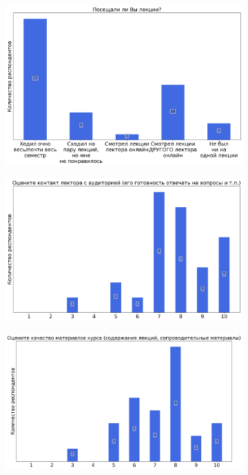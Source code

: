 		\begin{figure}[H]
			\centering
            \begin{subfigure}[b]{0.45\textwidth}
				\centering
				\includegraphics[width=\textwidth]{images/3 course/Теория поля/lecturer-questions-Гец А.В.-0.png}
			\end{subfigure}
			\begin{subfigure}[b]{0.45\textwidth}
				\centering
				\includegraphics[width=\textwidth]{images/3 course/Теория поля/lecturer-marks-Гец А.В.-0.png}
			\end{subfigure}
			\begin{subfigure}[b]{0.45\textwidth}
				\centering
				\includegraphics[width=\textwidth]{images/3 course/Теория поля/lecturer-marks-Гец А.В.-1.png}

\end{subfigure}
\end{figure}
